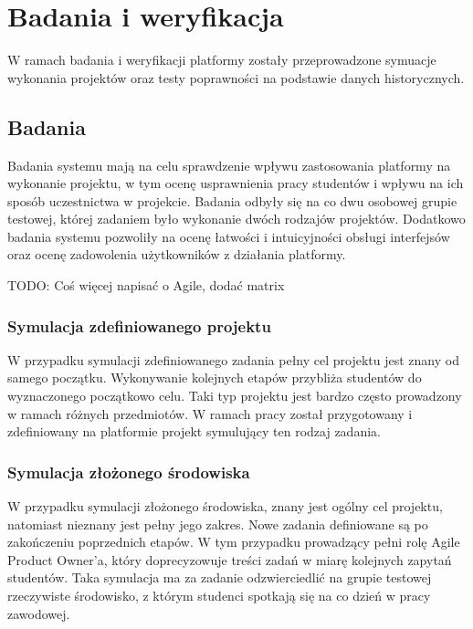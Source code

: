\chapter{Badania i weryfikacja}
\label{chapter:research}

W ramach badania i weryfikacji platformy zostały przeprowadzone symuacje wykonania projektów oraz testy poprawności na podstawie danych historycznych.

\section{Badania}

Badania systemu mają na celu sprawdzenie wpływu zastosowania platformy na wykonanie projektu, w tym ocenę usprawnienia pracy studentów i wpływu na ich sposób uczestnictwa w projekcie.
Badania odbyły się na co dwu osobowej grupie testowej, której zadaniem było wykonanie dwóch rodzajów projektów.
Dodatkowo badania systemu pozwoliły na ocenę łatwości i intuicyjności obsługi interfejsów oraz ocenę zadowolenia użytkowników z działania platformy.

TODO: Coś więcej napisać o Agile, dodać matrix

\subsection{Symulacja zdefiniowanego projektu}

W przypadku symulacji zdefiniowanego zadania pełny cel projektu jest znany od samego początku.
Wykonywanie kolejnych etapów przybliża studentów do wyznaczonego początkowo celu.
Taki typ projektu jest bardzo często prowadzony w ramach różnych przedmiotów.
W ramach pracy został przygotowany i zdefiniowany na platformie projekt symulujący ten rodzaj zadania.

\subsection{Symulacja złożonego środowiska}

W przypadku symulacji złożonego środowiska, znany jest ogólny cel projektu, natomiast nieznany jest pełny jego zakres.
Nowe zadania definiowane są po zakończeniu poprzednich etapów.
W tym przypadku prowadzący pełni rolę Agile Product Owner’a, który doprecyzowuje treści zadań w miarę kolejnych zapytań studentów.
Taka symulacja ma za zadanie odzwierciedlić na grupie testowej rzeczywiste środowisko, z którym studenci spotkają się na co dzień w pracy zawodowej.

